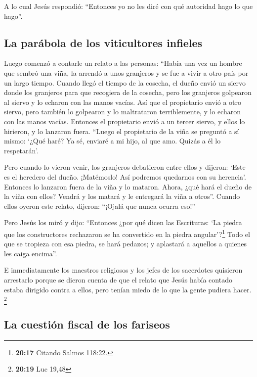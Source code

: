  A lo cual Jesús respondió: ``Entonces yo no les diré con
qué autoridad hago lo que hago''.

\hypertarget{la-paruxe1bola-de-los-viticultores-infieles}{%
\subsection{La parábola de los viticultores
infieles}\label{la-paruxe1bola-de-los-viticultores-infieles}}

 Luego comenzó a contarle un relato a las personas:
``Había una vez un hombre que sembró una viña, la arrendó a unos
granjeros y se fue a vivir a otro país por un largo tiempo.
 Cuando llegó el tiempo de la cosecha, el dueño envió un
siervo donde los granjeros para que recogiera de la cosecha, pero los
granjeros golpearon al siervo y lo echaron con las manos vacías.
 Así que el propietario envió a otro siervo, pero también
lo golpearon y lo maltrataron terriblemente, y lo echaron con las manos
vacías.  Entonces el propietario envió a un tercer
siervo, y ellos lo hirieron, y lo lanzaron fuera. 
``Luego el propietario de la viña se preguntó a sí mismo: `¿Qué haré? Ya
sé, enviaré a mi hijo, al que amo. Quizás a él lo respetarán'.

 Pero cuando lo vieron venir, los granjeros debatieron
entre ellos y dijeron: `Este es el heredero del dueño. ¡Matémoslo! Así
podremos quedarnos con su herencia'.  Entonces lo
lanzaron fuera de la viña y lo mataron. Ahora, ¿qué hará el dueño de la
viña con ellos?  Vendrá y los matará y le entregará la
viña a otros''. Cuando ellos oyeron este relato, dijeron: ``¡Ojalá que
nunca ocurra eso!''

 Pero Jesús los miró y dijo: ``Entonces ¿por qué dicen
las Escrituras: `La piedra que los constructores rechazaron se ha
convertido en la piedra angular'?\footnote{\textbf{20:17} Citando Salmos
  118:22.}  Todo el que se tropieza con esa piedra, se
hará pedazos; y aplastará a aquellos a quienes les caiga encima''.

 E inmediatamente los maestros religiosos y los jefes de
los sacerdotes quisieron arrestarlo porque se dieron cuenta de que el
relato que Jesús había contado estaba dirigido contra a ellos, pero
tenían miedo de lo que la gente pudiera hacer. \footnote{\textbf{20:19}
  Luc 19,48}

\hypertarget{la-cuestiuxf3n-fiscal-de-los-fariseos}{%
\subsection{La cuestión fiscal de los
fariseos}\label{la-cuestiuxf3n-fiscal-de-los-fariseos}}


